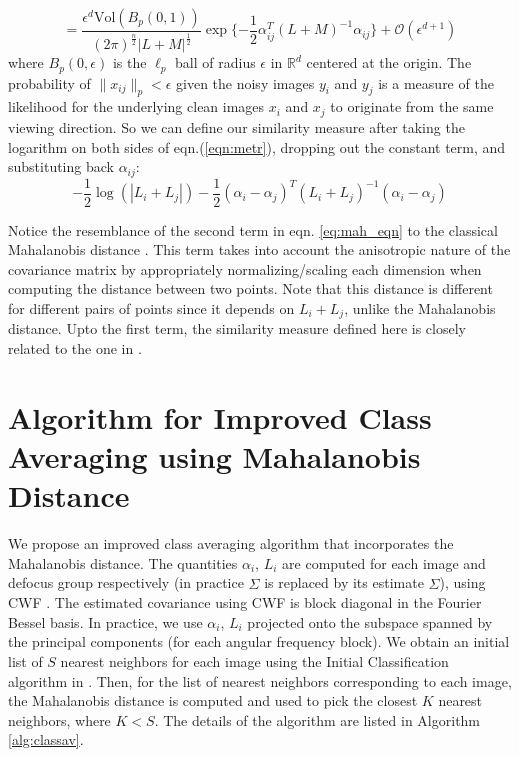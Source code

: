 \documentclass{article}
\begin{document}
\begin{equation}
= \frac{\epsilon^d \text{Vol}(B_p(0,1)) }{(2 \pi)^{\frac{n}{2}} |L + M|^{\frac{1}{2}}} \exp\{-\frac{1}{2}\alpha_{ij}^T(L+M)^{-1}\alpha_{ij}\} +  \mathcal{O}(\epsilon^{d+1}) 
\label{eqn:metr}
\end{equation}
where $B_p(0,\epsilon)$ is the $\ell_p$ ball of radius $\epsilon$ in $\mathbb{R}^d$ centered at the origin. The probability of $\|x_{ij}\|_p < \epsilon$ given the noisy images $y_i$ and $y_j$  is a measure of the likelihood for the underlying clean images $x_i$ and $x_j$ to originate from the same viewing direction. So we can define our similarity measure after taking the logarithm on both sides of eqn.(\ref{eqn:metr}), dropping out the constant term, and substituting back $\alpha_{ij}$:
\begin{equation}\label{eq:mah_eqn}
 -\frac{1}{2}\log(|L_i + L_j|) -\frac{1}{2}(\alpha_i - \alpha_j)^T(L_i+L_j)^{-1}(\alpha_i -\alpha_j)
\end{equation}

Notice the resemblance of the second term in eqn. \ref{eq:mah_eqn} to the classical Mahalanobis distance \cite{mah}. This term takes into account the anisotropic nature of the covariance matrix by appropriately normalizing/scaling each dimension when computing the distance between two points. Note that this distance is different for different pairs of points since it depends on $L_i + L_j$, unlike the Mahalanobis distance. Upto the first term, the similarity measure defined here is closely related to the one in \cite{nlica}. 

\section{Algorithm for Improved Class Averaging using Mahalanobis Distance}

We propose an improved class averaging algorithm that incorporates the Mahalanobis distance. The quantities $\alpha_i$, $L_i$ are computed for each image and defocus group respectively (in practice $\Sigma$ is replaced by its estimate $\hat{\Sigma}$), using CWF \cite{cwf}. The estimated covariance using CWF is block diagonal in the Fourier Bessel basis. In practice, we use $\alpha_i$, $L_i$ projected onto the subspace spanned by the principal components (for each angular frequency block). We obtain an initial list of $S$ nearest neighbors for each image using the Initial Classification algorithm in \cite{zhao}. Then, for the list of nearest neighbors corresponding to each image, the Mahalanobis distance is computed and used to pick the closest $K$ nearest neighbors, where $K<S$. The details of the algorithm are listed in Algorithm \ref{alg:classav}. 
\end{document}
